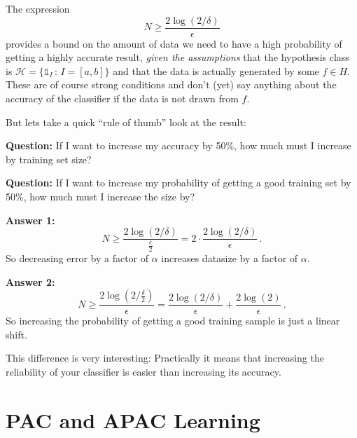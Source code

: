 \documentclass[10pt, table, handout]{beamer}
\begin{document}
\begin{frame}[fragile]{}
The expression 
$$
N\geq \frac{2\log(2/\delta)}{\epsilon}
$$
provides a bound on the amount of data we need to have a high probability of getting a highly accurate result, \textit{given the assumptions} that the hypothesis class is $\mathcal{H} = \{\mathds{1}_I\,:\,I = [a,b]\}$ and that the data is actually generated by some $f\in H$. These are of course strong conditions and don't (yet) say anything about the accuracy of the classifier if the data is not drawn from $f$. \pause

But lets take a quick ``rule of thumb'' look at the result: 

\textbf{Question:} If I want to increase my accuracy by 50\%, how much must I increase by training set size? \pause

\textbf{Question:} If I want to increase my probability of getting a good training set by 50\%, how much must I increase the size by?
\end{frame}




\begin{frame}[fragile]{}
\textbf{Answer 1:}
$$
N\geq \frac{2\log(2/\delta)}{\frac{\epsilon}{2}} = 2\cdot \frac{2\log(2/\delta)}{\epsilon}\,.
$$
So decreasing error by a factor of $\alpha$ increases datasize by a factor of $\alpha$. \pause

\textbf{Answer 2:}
$$
N\geq \frac{2\log(2/\frac{\delta}{2})}{\epsilon} = \frac{2\log(2/\delta)}{\epsilon} + \frac{2\log(2)}{\epsilon}  \,.
$$
So increasing the probability of getting a good training sample is just a linear shift. 

This difference is very interesting: Practically it means that increasing the reliability of your classifier is easier than increasing its accuracy. 

\end{frame}









\section{PAC and APAC Learning}
\end{document}
